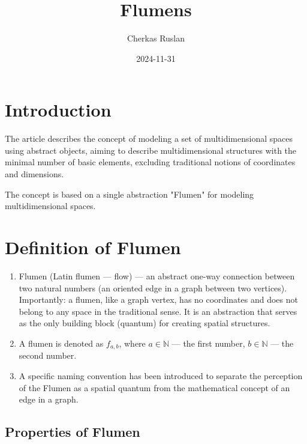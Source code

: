 \documentclass[final]{article}
\begin{document}
    \title{Flumens}
    \author{Cherkas Ruslan}
    \date{2024-11-31}

    \maketitle
    \tableofcontents


    \section{Introduction}

        The article describes the concept of modeling a set of multidimensional 
        spaces using abstract objects, aiming to describe multidimensional 
        structures with the minimal number of basic elements, excluding 
        traditional notions of coordinates and dimensions.

        The concept is based on a single abstraction "Flumen" for modeling 
        multidimensional spaces.

    \section{Definition of Flumen}

        \begin{enumerate}

            \item Flumen (Latin flumen — flow) — an abstract one-way connection 
            between two natural numbers (an oriented edge in a graph between two 
            vertices). Importantly: a flumen, like a graph vertex, has no 
            coordinates and does not belong to any space in the traditional 
            sense. It is an abstraction that serves as the only building block 
            (quantum) for creating spatial structures.

            \item A flumen is denoted as \( f_{a,b} \), where \( a \in 
            \mathbb{N} \) — the first number, \( b \in \mathbb{N} \) — the 
            second number.

            \item A specific naming convention has been introduced to separate 
            the perception of the Flumen as a spatial quantum from the 
            mathematical concept of an edge in a graph.

        \end{enumerate}


    \subsection{Properties of Flumen}
\end{document}
